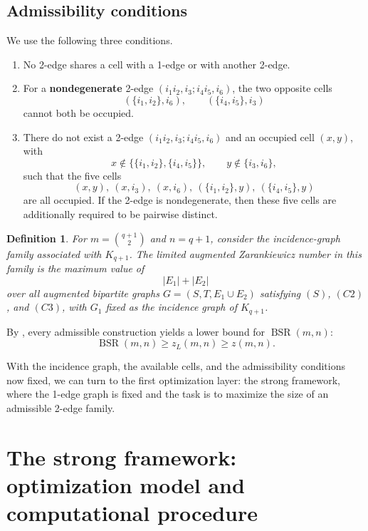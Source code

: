 \documentclass[10pt]{article}
\newcommand{\0}{\mathbf{0}}
\newcommand{\1}{\mathbf{1}}
\newtheorem{Def}[Thm]{Definition}
\begin{document}
\subsection*{Admissibility conditions}

We use the following three conditions.
\begin{enumerate}
  \item[(S)] No 2-edge shares a cell with a 1-edge or with another 2-edge.
  \item[(C2)] For a \textbf{nondegenerate} 2-edge \((i_1i_2,i_3; i_4i_5,i_6)\), the two opposite cells
  \[
  (\{i_1,i_2\},i_6),\qquad (\{i_4,i_5\},i_3)
  \]
  cannot both be occupied.
  \item[(C3)] There do not exist a 2-edge \((i_1i_2,i_3; i_4i_5,i_6)\) and an occupied cell \((x,y)\), with
  \[
  x\notin\bigl\{\{i_1,i_2\},\{i_4,i_5\}\bigr\},\qquad y\notin\{i_3,i_6\},
  \]
  such that the five cells
  \[
  (x,y),\ (x,i_3),\ (x,i_6),\ (\{i_1,i_2\},y),\ (\{i_4,i_5\},y)
  \]
  are all occupied. If the 2-edge is nondegenerate, then these five cells are additionally required to be pairwise distinct.
\end{enumerate}

\begin{Def}
For \(m=\binom{q+1}{2}\) and \(n=q+1\), consider the incidence-graph family associated with \(K_{q+1}\). The limited augmented Zarankiewicz number in this family is the maximum value of
\[
|E_1|+|E_2|
\]
over all augmented bipartite graphs \(G=(S,T,E_1\cup E_2)\) satisfying \((S)\), \((C2)\), and \((C3)\), with \(G_1\) fixed as the incidence graph of \(K_{q+1}\).
\end{Def}

By \cite{QCX26a}, every admissible construction yields a lower bound for \(\operatorname{BSR}(m,n)\):
\[
\operatorname{BSR}(m,n)\ge z_L(m,n)\ge z(m,n).
\]

{With the incidence graph, the available cells, and the admissibility conditions now fixed, we can turn to the first optimization layer: the strong framework, where the 1-edge graph is fixed and the task is to maximize the size of an admissible 2-edge family.}

\section{The strong framework: optimization model and computational procedure}
\end{document}
